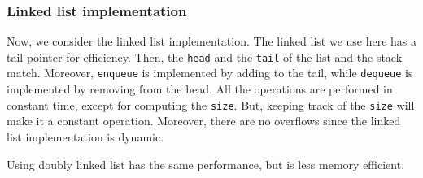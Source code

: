 \documentclass[a4paper, openany]{memoir}
\begin{document}
\subsubsection{Linked list implementation}
Now, we consider the linked list implementation. The linked list we use here has a tail pointer for efficiency. Then, the \texttt{head} and the \texttt{tail} of the list and the stack match. Moreover, \texttt{enqueue} is implemented by adding to the tail, while \texttt{dequeue} is implemented by removing from the head. All the operations are performed in constant time, except for computing the \texttt{size}. But, keeping track of the \texttt{size} will make it a constant operation. Moreover, there are no overflows since the linked list implementation is dynamic.

\noindent Using doubly linked list has the same performance, but is less memory efficient.
\end{document}

